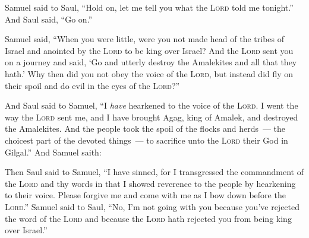 \begin{inparaenum}
   Samuel said to Saul, ``Hold on, let me tell you what the \textsc{Lord} told me tonight.'' And Saul said, ``Go on.''%
  
   Samuel said, ``When you were little, were you not made head of the tribes of Israel and anointed by the \textsc{Lord} to be king over Israel?%
   And the \textsc{Lord} sent you on a journey and said, `Go and utterly destroy the Amalekites and all that they hath.'%
   Why then did you not obey the voice of the \textsc{Lord}, but instead did fly on their spoil and do evil in the eyes of the \textsc{Lord}?''%
  
   And Saul said to Samuel, ``I \emph{have} hearkened to the voice of the \textsc{Lord}. I went the way the \textsc{Lord} sent me, and I have brought Agag, king of Amalek, and destroyed the Amalekites.%
   And the people took the spoil of the flocks and herds~--- the choicest part of the devoted things~--- to sacrifice unto the \textsc{Lord} their God in Gilgal.''%
   And Samuel saith:%
  
  
  
  
  
   Then Saul said to Samuel, ``I have sinned, for I transgressed the commandment of the \textsc{Lord} and thy words in that I showed reverence to the people by hearkening to their voice.%
   Please forgive me and come with me as I bow down before the \textsc{Lord}.''%
   Samuel said to Saul, ``No, I'm not going with you because you've rejected the word of the \textsc{Lord} and because the \textsc{Lord} hath rejected you from being king over Israel.''%
  

\end{inparaenum}

